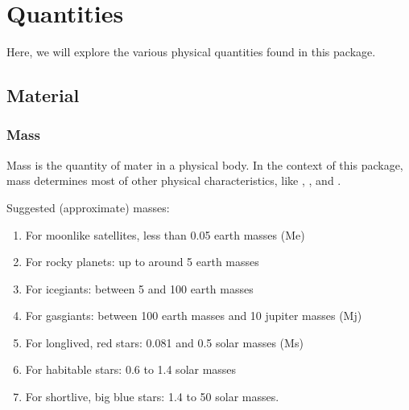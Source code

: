\documentclass[letterpaper,10pt,english]{sphinxmanual}
\begin{document}
\chapter{Quantities}
\label{\detokenize{quantities/quantities:quantities}}\label{\detokenize{quantities/quantities::doc}}\label{\detokenize{quantities/quantities:id1}}
\sphinxAtStartPar
Here, we will explore the various physical quantities found in this package.


\section{Material}
\label{\detokenize{quantities/material/material:material}}\label{\detokenize{quantities/material/material::doc}}

\subsection{Mass}
\label{\detokenize{quantities/material/mass:mass}}\label{\detokenize{quantities/material/mass::doc}}\label{\detokenize{quantities/material/mass:id1}}
\sphinxAtStartPar
Mass is the quantity of mater in a physical body.
In the context of this package, mass determines most of other physical characteristics,
like {\hyperref[\detokenize{quantities/geometric/radius:id1}]{}}, {\hyperref[\detokenize{quantities/surface/emission/luminosity:id1}]{}}, {\hyperref[\detokenize{quantities/rotational/spin_period:id1}]{}} and
{\hyperref[\detokenize{quantities/life/lifetime:id1}]{}}.

\sphinxAtStartPar
Suggested (approximate) masses:
\begin{enumerate}
%
\item {} 
\sphinxAtStartPar
For moon\sphinxhyphen{}like satellites, less than 0.05 earth masses (Me)

\item {} 
\sphinxAtStartPar
For rocky planets: up to around 5 earth masses

\item {} 
\sphinxAtStartPar
For ice\sphinxhyphen{}giants: between 5 and 100 earth masses

\item {} 
\sphinxAtStartPar
For gas\sphinxhyphen{}giants: between 100 earth masses and 10 jupiter masses (Mj)

\item {} 
\sphinxAtStartPar
For long\sphinxhyphen{}lived, red stars: 0.081 and 0.5 solar masses (Ms)

\item {} 
\sphinxAtStartPar
For habitable stars: 0.6 to 1.4 solar masses

\item {} 
\sphinxAtStartPar
For short\sphinxhyphen{}live, big blue stars: 1.4 to 50 solar masses.

\end{enumerate}
\end{document}
